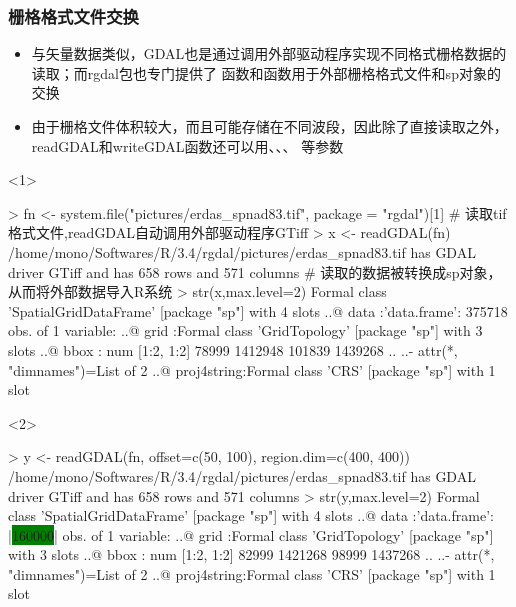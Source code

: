 \subsubsection{栅格格式文件交换}
\begin{frame}[t,fragile]{\subsecname}{\subsubsecname}
\begin{itemize} 
\item<1-> 与矢量数据类似，GDAL也是通过调用外部驱动程序实现不同格式栅格数据的读取；而rgdal包也专门提供了
函数和函数用于外部栅格格式文件和sp对象的交换
\item<2-> 由于栅格文件体积较大，而且可能存储在不同波段，因此除了直接读取之外，
readGDAL和writeGDAL函数还可以用、、、
等参数
\end{itemize}

\begin{overlayarea}{\textwidth}{\textheight}
\begin{onlyenv}<1>
\begin{rcode}
> fn <- system.file("pictures/erdas_spnad83.tif", package = "rgdal")[1]
# 读取tif格式文件,readGDAL自动调用外部驱动程序GTiff
> x <- readGDAL(fn)
/home/mono/Softwares/R/3.4/rgdal/pictures/erdas_spnad83.tif has GDAL driver GTiff 
and has 658 rows and 571 columns
# 读取的数据被转换成sp对象，从而将外部数据导入R系统
> str(x,max.level=2)
Formal class 'SpatialGridDataFrame' [package "sp"] with 4 slots
  ..@ data       :'data.frame': 375718 obs. of  1 variable:
  ..@ grid       :Formal class 'GridTopology' [package "sp"] with 3 slots
  ..@ bbox       : num [1:2, 1:2] 78999 1412948 101839 1439268
  .. ..- attr(*, "dimnames")=List of 2
  ..@ proj4string:Formal class 'CRS' [package "sp"] with 1 slot
\end{rcode}
\end{onlyenv}

\begin{onlyenv}<2>
\begin{rcode}
> y <- readGDAL(fn, offset=c(50, 100), region.dim=c(400, 400))
/home/mono/Softwares/R/3.4/rgdal/pictures/erdas_spnad83.tif has GDAL driver GTiff 
and has 658 rows and 571 columns
> str(y,max.level=2)
Formal class 'SpatialGridDataFrame' [package "sp"] with 4 slots
  ..@ data       :'data.frame': |\colorbox{green}{160000}| obs. of  1 variable:
  ..@ grid       :Formal class 'GridTopology' [package "sp"] with 3 slots
  ..@ bbox       : num [1:2, 1:2] 82999 1421268 98999 1437268
  .. ..- attr(*, "dimnames")=List of 2
  ..@ proj4string:Formal class 'CRS' [package "sp"] with 1 slot
\end{rcode}
\end{onlyenv}


\end{overlayarea}
\end{frame}
